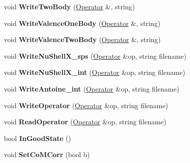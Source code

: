 \begin{DoxyCompactItemize}
\item 
\hypertarget{classReadWrite_a7bae483d2d587b66b3bf5ed734139cde}{void {\bfseries Write\-Two\-Body} (\hyperlink{classOperator}{Operator} \&, string)}\label{classReadWrite_a7bae483d2d587b66b3bf5ed734139cde}

\item 
\hypertarget{classReadWrite_a75dd4196074d74e1e7ea0e0b10aafc85}{void {\bfseries Write\-Valence\-One\-Body} (\hyperlink{classOperator}{Operator} \&, string)}\label{classReadWrite_a75dd4196074d74e1e7ea0e0b10aafc85}

\item 
\hypertarget{classReadWrite_aeb9256b7a68dcb45fac250b45af07548}{void {\bfseries Write\-Valence\-Two\-Body} (\hyperlink{classOperator}{Operator} \&, string)}\label{classReadWrite_aeb9256b7a68dcb45fac250b45af07548}

\item 
\hypertarget{classReadWrite_a8a7dc85b22c8f468d153d3fde9f39394}{void {\bfseries Write\-Nu\-Shell\-X\-\_\-sps} (\hyperlink{classOperator}{Operator} \&op, string filename)}\label{classReadWrite_a8a7dc85b22c8f468d153d3fde9f39394}

\item 
\hypertarget{classReadWrite_a2028159ab7f8c227613834b39794e157}{void {\bfseries Write\-Nu\-Shell\-X\-\_\-int} (\hyperlink{classOperator}{Operator} \&op, string filename)}\label{classReadWrite_a2028159ab7f8c227613834b39794e157}

\item 
\hypertarget{classReadWrite_a371194595d9412cbb8f1b432a6526f5a}{void {\bfseries Write\-Antoine\-\_\-int} (\hyperlink{classOperator}{Operator} \&op, string filename)}\label{classReadWrite_a371194595d9412cbb8f1b432a6526f5a}

\item 
\hypertarget{classReadWrite_a771ed1ac7ca0cc9cb6a209da170dd351}{void {\bfseries Write\-Operator} (\hyperlink{classOperator}{Operator} \&op, string filename)}\label{classReadWrite_a771ed1ac7ca0cc9cb6a209da170dd351}

\item 
\hypertarget{classReadWrite_ab924c67864c7af28bcc22a9b87abafb3}{void {\bfseries Read\-Operator} (\hyperlink{classOperator}{Operator} \&op, string filename)}\label{classReadWrite_ab924c67864c7af28bcc22a9b87abafb3}

\item 
\hypertarget{classReadWrite_a05ec8e21842e94d788bb36c7d11f46b9}{bool {\bfseries In\-Good\-State} ()}\label{classReadWrite_a05ec8e21842e94d788bb36c7d11f46b9}

\item 
\hypertarget{classReadWrite_a5e81dd4ce4adfe6fc08af81440003bb9}{void {\bfseries Set\-Co\-M\-Corr} (bool b)}\label{classReadWrite_a5e81dd4ce4adfe6fc08af81440003bb9}

\end{DoxyCompactItemize}
